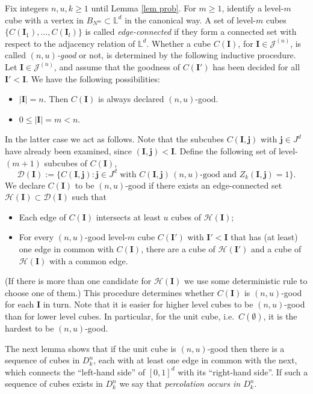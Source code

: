 \documentclass[11pt,a4paper]{article}
\newcommand{\Ib}{\ensuremath{\mathbf{I}}}
\newcommand{\Ij}{\ensuremath{\mathbf{j}}}
\newcommand{\IL}{\ensuremath{\mathbb{L}}}
\newcommand{\DD}{\ensuremath{\mathcal{D}}}
\newcommand{\JJ}{\ensuremath{\mathcal{J}}}
\newcommand{\HH}{\ensuremath{\mathcal{H}}}
\theoremstyle{remark}
\begin{document}
Fix integers $n,u,k \geq 1$ until Lemma \ref{lem prob}. For $m\geq 1$, identify a level-$m$ cube with a vertex in $B_{N^m} \subset \IL^d$ in the canonical way. A set of level-$m$ cubes $\{C(\Ib_1),\ldots,C(\Ib_l)\}$ is called \emph{edge-connected} if they form a connected set with respect to the adjacency relation of $\IL^d$. Whether a cube $C(\Ib)$, for $\Ib \in \JJ^{(n)}$, is called \emph{$(n,u)$-good} or not, is determined by the following inductive procedure. Let $\Ib \in \JJ^{(n)}$, and assume that the goodness of $C(\Ib')$ has been decided for all $\Ib' < \Ib$. We have the following possibilities:
\begin{itemize}
 \item[(a)] $|\Ib|=n$. Then $C(\Ib)$ is always declared $(n,u)$-good.
\item[(b)] $0 \leq |\Ib| = m<n$.
\end{itemize}
In the latter case we act as follows. Note that the subcubes $C(\Ib,\mathbf{j})$ with $\Ij \in J^d$ have already been examined, since $(\Ib,\Ij) < \Ib$.
Define the following set of level-$(m+1)$ subcubes of $C(\Ib)$, 
\begin{equation}\label{good subcubes}
   \DD(\Ib):= \{ C(\Ib,\Ij): \Ij \in J^d \text{ with } C(\Ib,\Ij) \, (n,u)\text{-good and } Z_k(\Ib,\Ij) =1 \}. 
 \end{equation}
We declare $C(\Ib)$ to be $(n,u)$-good if there exists an edge-connected set $\HH(\Ib)\subset \DD(\Ib)$ such that
\begin{itemize}
 \item[(i)] Each edge of $C(\Ib)$ intersects at least $u$ cubes of $\HH(\Ib)$;
\item[(ii)] For every $(n,u)$-good level-$m$ cube $C(\Ib')$ with $\Ib'<\Ib$ that has (at least) one edge in common with $C(\Ib)$, there are a cube of $\HH(\Ib')$ and a cube of $\HH(\Ib)$ with a common edge.
\end{itemize}
(If there is more than one candidate for $\HH(\Ib)$ we use some deterministic rule to choose one of them.)
This procedure determines whether $C(\Ib)$ is $(n,u)$-good for each $\Ib$ in turn. Note that it is easier for higher level cubes to be $(n,u)$-good than for lower level cubes. In particular, for the unit cube, i.e.\ $C(\emptyset)$, it is the hardest to be $(n,u)$-good. 


The next lemma shows that if the unit cube is $(n,u)$-good then there is a sequence of cubes in $D_k^n$, each with at least one edge in common with the next, which connects the ``left-hand side'' of $[0,1]^d$ with its ``right-hand side''. If such a sequence of cubes exists in $D_k^n$ we say that \emph{percolation occurs in $D_{k}^{n}$}. 
\end{document}
